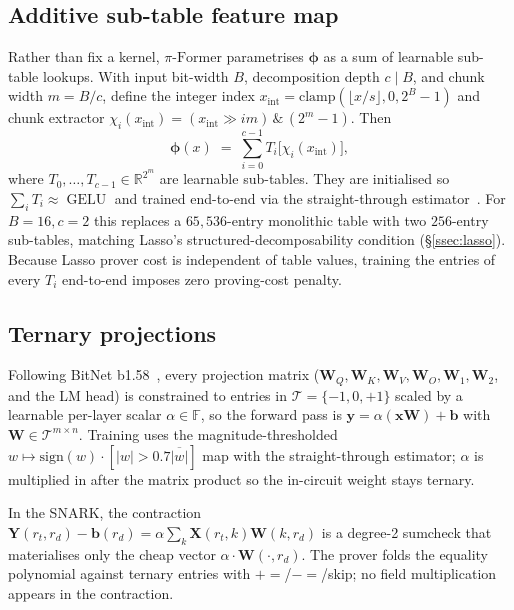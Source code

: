 \documentclass[letterpaper,twocolumn,10pt]{article}
\theoremstyle{remark}
\theoremstyle{definition}
\newcommand{\sys}{\ensuremath{\pi\text{-Former}}}
\newcommand{\FF}{\mathbb{F}}
\newcommand{\RR}{\mathbb{R}}
\newcommand{\bphi}{\boldsymbol{\phi}}
\newcommand{\bx}{\mathbf{x}}
\newcommand{\by}{\mathbf{y}}
\newcommand{\bb}{\mathbf{b}}
\newcommand{\bX}{\mathbf{X}}
\newcommand{\bY}{\mathbf{Y}}
\newcommand{\bW}{\mathbf{W}}
\newcommand{\calT}{\mathcal{T}}
\newcommand{\bits}{B}
\newcommand{\chunks}{c}
\newcommand{\chunkbits}{m}
\DeclareMathOperator{\GELU}{GELU}
\begin{document}
\subsection{Additive sub-table feature map}
\label{ssec:phi}

Rather than fix a kernel, \sys{} parametrises $\bphi$ as a sum of
learnable sub-table lookups. With input bit-width $\bits$, decomposition
depth $\chunks\!\mid\!\bits$, and chunk width
$\chunkbits\!=\!\bits/\chunks$, define the integer index
$x_{\mathrm{int}}\!=\!\mathrm{clamp}(\lfloor x/s\rfloor,0,2^{\bits}\!-\!1)$
and chunk extractor
$\chi_i(x_{\mathrm{int}})\!=\!(x_{\mathrm{int}}\!\gg\!i\chunkbits)\,\&\,(2^{\chunkbits}\!-\!1)$.
Then
\begin{equation}
  \bphi(x) \;=\; \sum_{i=0}^{\chunks-1} T_i\bigl[\chi_i(x_{\mathrm{int}})\bigr],
  \label{eq:phi}
\end{equation}
where $T_0,\dots,T_{\chunks-1}\!\in\!\RR^{2^{\chunkbits}}$ are
learnable sub-tables. They are initialised so $\sum_i T_i\!\approx\!\GELU$
and trained end-to-end via the straight-through
estimator~\cite{bengio2013estimating}. For $\bits\!=\!16,\chunks\!=\!2$
this replaces a $65{,}536$-entry monolithic table with two $256$-entry
sub-tables, matching Lasso's structured-decomposability condition
(\S\ref{ssec:lasso}). Because Lasso prover cost is independent of table
values, training the entries of every $T_i$ end-to-end imposes zero
proving-cost penalty.

\subsection{Ternary projections}
\label{ssec:ternary}
Following BitNet b1.58~\cite{ma2025bitnet}, every projection matrix
($\bW_Q,\bW_K,\bW_V,\bW_O,\bW_1,\bW_2$, and the LM head) is constrained
to entries in $\calT=\{-1,0,+1\}$ scaled by a learnable per-layer
scalar $\alpha\!\in\!\FF$, so the forward pass is
$\by\!=\!\alpha(\bx\bW)+\bb$ with $\bW\!\in\!\calT^{m\times n}$.
Training uses the magnitude-thresholded
$w\!\mapsto\!\mathrm{sign}(w)\!\cdot\![|w|\!>\!0.7\overline{|w|}]$ map
with the straight-through estimator; $\alpha$ is multiplied in after
the matrix product so the in-circuit weight stays ternary.

In the SNARK, the contraction $\bY(r_t,r_d)\!-\!\bb(r_d)\!=\!\alpha\sum_k\bX(r_t,k)\bW(k,r_d)$
is a degree-2 sumcheck that materialises only the cheap vector
$\alpha\!\cdot\!\bW(\cdot,r_d)$. The prover folds the equality polynomial
against ternary entries with $+\!=$/$-\!=$/skip; no field multiplication
appears in the contraction.
\end{document}
